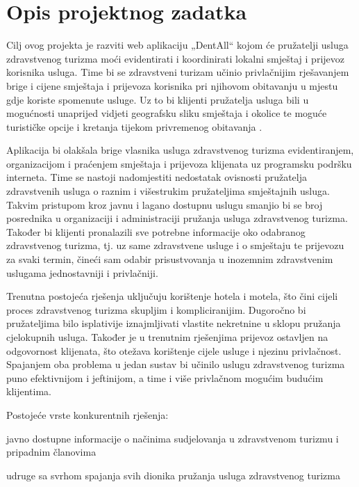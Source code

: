 \chapter{Opis projektnog zadatka}
		Cilj ovog projekta je razviti web aplikaciju „DentAll“ kojom će pružatelji usluga zdravstvenog turizma moći evidentirati i koordinirati lokalni smještaj i prijevoz korisnika usluga. Time bi se zdravstveni turizam učinio privlačnijim rješavanjem brige i cijene smještaja i prijevoza korisnika pri njihovom obitavanju u mjestu gdje koriste spomenute usluge. Uz to bi klijenti pružatelja usluga bili u mogućnosti unaprijed vidjeti geografsku sliku smještaja i okolice te moguće turističke opcije i kretanja tijekom privremenog obitavanja .
		
		\smallskip
		Aplikacija bi olakšala brige vlasnika usluga zdravstvenog turizma evidentiranjem, organizacijom i praćenjem smještaja i prijevoza klijenata uz programsku podršku interneta. Time se nastoji nadomjestiti nedostatak ovisnosti pružatelja zdravstvenih usluga o raznim i višestrukim pružateljima smještajnih usluga. Takvim pristupom kroz javnu i lagano dostupnu uslugu smanjio bi se broj posrednika u organizaciji i administraciji pružanja usluga zdravstvenog turizma. Također bi klijenti pronalazili sve potrebne informacije oko odabranog zdravstvenog turizma, tj. uz same zdravstvene usluge i o smještaju te prijevozu za svaki termin, čineći sam odabir prisustvovanja u inozemnim zdravstvenim uslugama jednostavniji i privlačniji.
		
		\smallskip
		Trenutna postojeća rješenja uključuju korištenje hotela i motela, što čini cijeli proces zdravstvenog turizma skupljim i kompliciranijim. Dugoročno bi pružateljima bilo isplativije iznajmljivati vlastite nekretnine u sklopu pružanja cjelokupnih usluga. Također je u trenutnim rješenjima prijevoz ostavljen na odgovornost klijenata, što otežava korištenje cijele usluge i njezinu privlačnost. Spajanjem oba problema u jedan sustav bi učinilo uslugu zdravstvenog turizma puno efektivnijom i jeftinijom, a time i više privlačnom mogućim budućim klijentima.
		
		\smallskip
		\noindent Postojeće vrste konkurentnih rješenja:
		\begin{packed_item}
			\item  javno dostupne informacije o načinima sudjelovanja u zdravstvenom turizmu i pripadnim članovima
			\item  udruge sa svrhom spajanja svih dionika pružanja usluga zdravstvenog turizma
		\end{packed_item}
		
